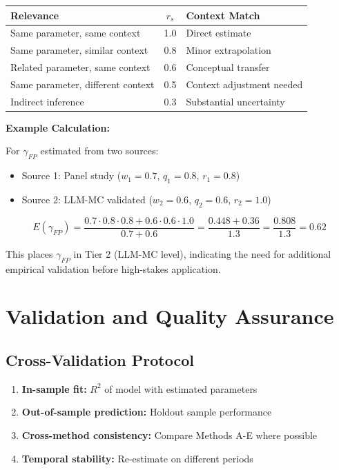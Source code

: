 \documentclass[11pt,a4paper]{article}
\theoremstyle{definition}
\begin{document}
\begin{tcolorbox}[colback=blue!5!white, colframe=blue!75!black, 
    title=\textbf{Operational Scoring Guide for $E(\theta)$ Components}]
\begin{center}
\small
\begin{tabular}{@{}lcp{6cm}@{}}
\toprule
\textbf{Relevance} & $r_s$ & \textbf{Context Match} \\
\midrule
Same parameter, same context & 1.0 & Direct estimate \\
Same parameter, similar context & 0.8 & Minor extrapolation \\
Related parameter, same context & 0.6 & Conceptual transfer \\
Same parameter, different context & 0.5 & Context adjustment needed \\
Indirect inference & 0.3 & Substantial uncertainty \\
\bottomrule
\end{tabular}
\end{center}

\end{tcolorbox}

\textbf{Example Calculation:}

For $\gamma_{FP}$ estimated from two sources:
\begin{itemize}[nosep]
\item Source 1: Panel study ($w_1 = 0.7$, $q_1 = 0.8$, $r_1 = 0.8$)
\item Source 2: LLM-MC validated ($w_2 = 0.6$, $q_2 = 0.6$, $r_2 = 1.0$)
\end{itemize}

\begin{equation}
E(\gamma_{FP}) = \frac{0.7 \cdot 0.8 \cdot 0.8 + 0.6 \cdot 0.6 \cdot 1.0}{0.7 + 0.6} 
= \frac{0.448 + 0.36}{1.3} = \frac{0.808}{1.3} = 0.62
\end{equation}

This places $\gamma_{FP}$ in Tier 2 (LLM-MC level), indicating the need for 
additional empirical validation before high-stakes application.



\section{Validation and Quality Assurance}
\label{sec:bbb-validation}

\subsection{Cross-Validation Protocol}

\begin{enumerate}
    \item \textbf{In-sample fit:} $R^2$ of model with estimated parameters
    \item \textbf{Out-of-sample prediction:} Holdout sample performance
    \item \textbf{Cross-method consistency:} Compare Methods A-E where possible
    \item \textbf{Temporal stability:} Re-estimate on different periods
\end{enumerate}
\end{document}
